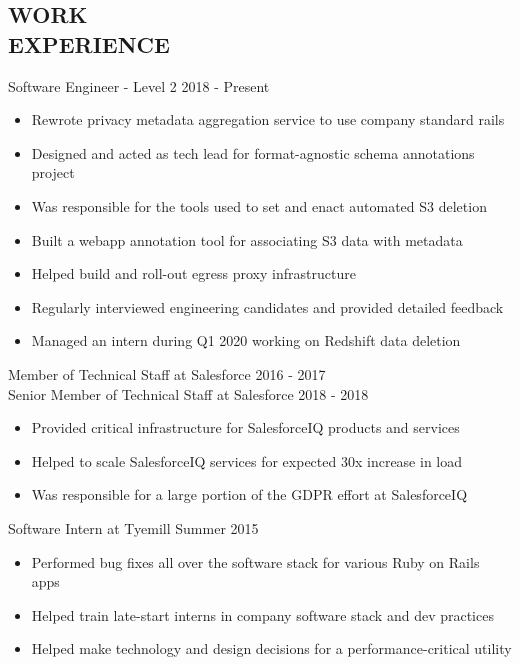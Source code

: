 \documentclass[line,margin]{res}
\begin{document}
\begin{resume}
\section{\textcolor{HeaderColor}{WORK \\ EXPERIENCE}} 
	      {\sc Software Engineer - Level 2} \hfill 2018 - Present
                 \begin{itemize}  \itemsep -2pt %
	             \item Rewrote privacy metadata aggregation service to use company standard rails
                 \item Designed and acted as tech lead for format-agnostic schema annotations project
                 \item Was responsible for the tools used to set and enact automated S3 deletion
                 \item Built a webapp annotation tool for associating S3 data with metadata
                 \item Helped build and roll-out egress proxy infrastructure
                 \item Regularly interviewed engineering candidates and provided detailed feedback
                 \item Managed an intern during Q1 2020 working on Redshift data deletion
                 \end{itemize}

	      {\sc Member of Technical Staff at Salesforce} \hfill 2016 - 2017 \\
	      {\sc Senior Member of Technical Staff at Salesforce} \hfill 2018 - 2018
                 \begin{itemize}  \itemsep -2pt %
	             \item Provided critical infrastructure for SalesforceIQ products and services
                 \item Helped to scale SalesforceIQ services for expected 30x increase in load
                 \item Was responsible for a large portion of the GDPR effort at SalesforceIQ
                 \end{itemize}

                {\sc Software Intern at Tyemill} \hfill Summer 2015
                 \begin{itemize}  \itemsep -2pt %
                 \item Performed bug fixes all over the software stack for various Ruby on Rails apps
	      \item Helped train late-start interns in company software stack and dev practices
	      \item Helped make technology and design decisions for a performance-critical utility
                 \end{itemize}


\end{resume}
\end{document}
